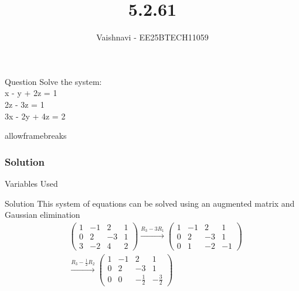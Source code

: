 \documentclass{beamer}
\title %
{5.2.61}
\author %
{Vaishnavi - EE25BTECH11059}
\begin{document}
\frame{\titlepage}
\begin{frame}{Question}
Solve the system:\\
  x - y + 2z = 1 \\
   2z - 3z = 1 \\
  3x - 2y + 4z = 2
\end{frame}
\begin{frame}{allowframebreaks}
\frametitle{Solution}
\begin{table}[H]    
  \centering
  
  \caption{Variables Used}
  \label{tab:1.10.2}
\end{table}

\end{frame}


\begin{frame}{Solution}
This system of equations can be solved using an augmented matrix and Gaussian elimination
\begin{align}
&\left(
\begin{array}{ccc|c}
1 & -1 & 2 & 1 \\
0 & 2 & -3 & 1 \\
3 & -2 & 4 & 2
\end{array}
\right)
\xrightarrow{R_3 - 3R_1}
\left(
\begin{array}{ccc|c}
1 & -1 & 2 & 1 \\
0 & 2 & -3 & 1 \\
0 & 1 & -2 & -1
\end{array}
\right) \\
&\xrightarrow{R_3 - \frac{1}{2} R_2}
\left(
\begin{array}{ccc|c}
1 & -1 & 2 & 1 \\
0 & 2 & -3 & 1 \\
0 & 0 & -\frac{1}{2} & -\frac{3}{2}
\end{array}
\right) 
\end{align}
\end{frame}
\end{document}
